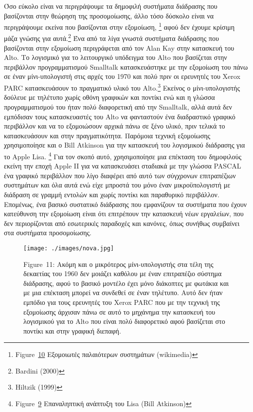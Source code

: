 \documentclass[
]{article}
\begin{document}
Όσο εύκολο είναι να περιγράψουμε τα δημοφιλή συστήματα διάδρασης που
βασίζονται στην θεώρηση της προσομοίωσης, άλλο τόσο δύσκολο είναι να
περιγράψουμε εκείνα που βασίζονται στην εξομοίωση, \footnote{Figure~\protect\hyperlink{fig:emulators}{10}
  Εξομοιωτές παλαιότερων συστημάτων (wikimedia)} αφού δεν έχουμε κρίσιμη
μάζα γνώσης για αυτά.\footnote{Bardini (2000)} Ένα από τα λίγα γνωστά
συστήματα διάδρασης που βασίζονται στην εξομοίωση περιγράφεται από τον
Alan Kay στην κατασκευή του Alto. Το λογισμικό για το λειτουργικό
υπόδειγμα του Alto που βασίζεται στην περιβάλλον προγραμματισμού
Smalltalk κατασκευάστηκε με την εξομοίωση του πάνω σε έναν
μίνι-υπολογιστή στις αρχές του 1970 και πολύ πριν οι ερευνητές του Xerox
PARC κατασκευάσουν το πραγματικό υλικό του Alto.\footnote{Hiltzik (1999)}
Εκείνος ο μίνι-υπολογιστής δούλευε με τηλέτυπο χωρίς οθόνη γραφικών και
ποντίκι ενώ και η γλώσσα προγραμματισμού του ήταν πολύ διαφορετική από
την Smalltalk, αλλά αυτά δεν εμπόδισαν τους κατασκευαστές του Alto να
φανταστούν ένα διαδραστικό γραφικό περιβάλλον και να το εξομοιώσουν
αρχικά πάνω σε ξένο υλικό, πριν τελικά το κατασκευάσουν και στην
πραγματικότητα. Παρόμοια τεχνική εξομοίωσης χρησιμοποίησε και ο Bill
Atkinson για την κατασκευή του λογισμικού διάδρασης για το Apple Lisa.
\footnote{Figure~\protect\hyperlink{fig:lisa-bootstrapping}{9}
  Επαναληπτική ανάπτυξη του Lisa (Bill Atkinson)} Για τον σκοπό αυτό,
χρησιμοποίησε μια επέκταση του δημοφιλούς εκείνη την εποχή Apple II για
να κατασκευάσει σταδιακά με την γλώσσα PASCAL ένα γραφικό περιβάλλον που
λίγο διαφέρει από αυτό των σύγχρονων επιτραπέζιων συστημάτων και όλα
αυτά ενώ είχε μπροστά του μόνο έναν μικροϋπολογιστή με διάδραση σε
γραμμή εντολών και χωρίς ποντίκι και παραθυρικό περιβάλλον. Επομένως,
ένα βασικό συστατικό διάδρασης που εμφανίζουν τα συστήματα που έχουν
κατεύθυνση την εξομοίωση είναι ότι επιτρέπουν την κατασκευή νέων
εργαλείων, που δεν περιορίζονται από εσωτερικές παραδοχές και κανόνες,
όπως συνήθως συμβαίνει στα συστήματα προσομοίωσης.

\leavevmode{}%
\begin{figure}
\hypertarget{fig:nova}{%
\centering
\texttt{[image: ./images/nova.jpg]}
\caption{Figure~11: Ακόμη και ο μικρότερος μίνι-υπολογιστής στα τέλη της
δεκαετίας του 1960 δεν μοιάζει καθόλου με έναν επιτραπέζιο σύστημα
διάδρασης, αφού το βασικό μοντέλο έχει μόνο διάκοπτες με φωτάκια και με
μια επέκταση μπορεί να συνδεθεί σε έναν τηλέτυπο. Αυτό δεν ήταν εμπόδιο
για τους ερευνητές του Xerox PARC που με την τεχνική της εξομοίωσης
άρχισαν πάνω σε αυτό το μηχάνημα την κατασκευή του λογισμικού για το
Alto που είναι πολύ διαφορετικό αφού βασίζεται στο ποντίκι και στην
γραφική διεπαφή.}\label{fig:nova}
}
\end{figure}
\end{document}
